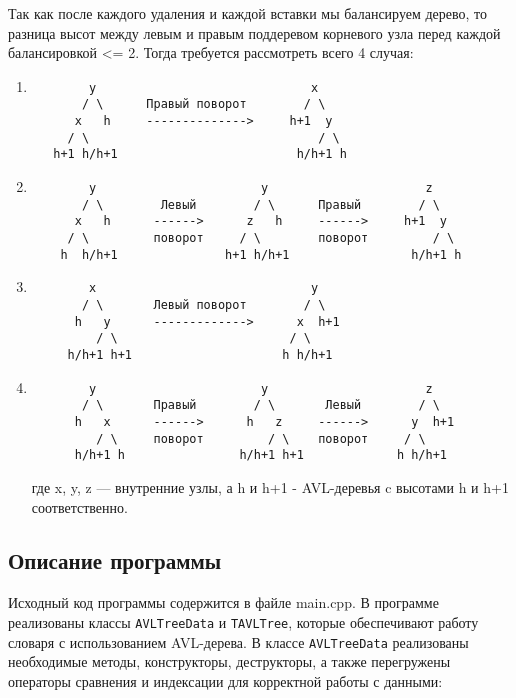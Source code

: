 \documentclass[12pt]{article}
\begin{document}
Так как после каждого удаления и каждой вставки мы балансируем дерево, то разница высот между левым и правым поддеревом корневого узла перед каждой балансировкой <= 2. Тогда требуется рассмотреть всего 4 случая:
\begin{enumerate}
    \item
    \begin{verbatim}
        y                              x
       / \      Правый поворот        / \
      x   h     -------------->     h+1  y
     / \                                / \
   h+1 h/h+1                         h/h+1 h
    \end{verbatim}

    \item
    \begin{verbatim}
        y                       y                      z
       / \        Левый        / \      Правый        / \
      x   h      ------>      z   h     ------>     h+1  y
     / \         поворот     / \        поворот         / \
    h  h/h+1               h+1 h/h+1                 h/h+1 h
    \end{verbatim}

    \item
    \begin{verbatim}
        x                              y
       / \       Левый поворот        / \
      h   y      ------------->      x  h+1
         / \                        / \
     h/h+1 h+1                     h h/h+1
    \end{verbatim}

    \item
    \begin{verbatim}
        y                       y                      z
       / \       Правый        / \       Левый        / \
      h   x      ------>      h   z     ------>      y  h+1
         / \     поворот         / \    поворот     / \
      h/h+1 h                h/h+1 h+1             h h/h+1
    \end{verbatim}
    где x, y, z — внутренние узлы, а h и h+1 - AVL-деревья c высотами h и h+1 соответственно.
\end{enumerate}

\subsection*{Описание программы}

Исходный код программы содержится в файле main.cpp. В программе реализованы классы \texttt{AVLTreeData} и \texttt{TAVLTree}, которые обеспечивают работу словаря с использованием AVL-дерева. В классе \texttt{AVLTreeData} реализованы необходимые методы, конструкторы, деструкторы, а также перегружены операторы сравнения и индексации для корректной работы с данными:
\end{document}
